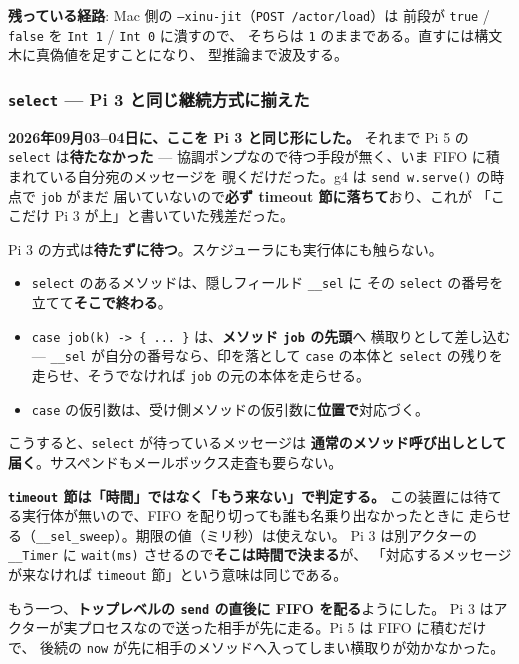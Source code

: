 \documentclass[11pt,a4paper]{ltjsarticle}
\begin{document}
\textbf{残っている経路}: Mac 側の \texttt{--xinu-jit}（\texttt{POST /actor/load}）は
前段が \texttt{true} / \texttt{false} を \texttt{Int 1} / \texttt{Int 0} に潰すので、
そちらは \texttt{1} のままである。直すには構文木に真偽値を足すことになり、
型推論まで波及する。

\subsubsection*{\texttt{select} --- Pi 3 と同じ継続方式に揃えた}
\label{sec:pi5-select}

\textbf{2026年09月03--04日に、ここを Pi 3 と同じ形にした。}
それまで Pi 5 の \texttt{select} は\textbf{待たなかった} ---
協調ポンプなので待つ手段が無く、いま FIFO に積まれている自分宛のメッセージを
覗くだけだった。g4 は \texttt{send w.serve()} の時点で \texttt{job} がまだ
届いていないので\textbf{必ず timeout 節に落ちて}おり、これが
「ここだけ Pi 3 が上」と書いていた残差だった。

Pi 3 の方式は\textbf{待たずに待つ}。スケジューラにも実行体にも触らない。

\begin{itemize}
\item \texttt{select} のあるメソッドは、隠しフィールド \texttt{\_\_sel} に
  その \texttt{select} の番号を立てて\textbf{そこで終わる}。
\item \texttt{case job(k) -> \{ ... \}} は、\textbf{メソッド \texttt{job} の先頭}へ
  横取りとして差し込む ---
  \texttt{\_\_sel} が自分の番号なら、印を落として \texttt{case} の本体と
  \texttt{select} の残りを走らせ、そうでなければ \texttt{job} の元の本体を走らせる。
\item \texttt{case} の仮引数は、受け側メソッドの仮引数に\textbf{位置で}対応づく。
\end{itemize}

こうすると、\texttt{select} が待っているメッセージは
\textbf{通常のメソッド呼び出しとして届く}。サスペンドもメールボックス走査も要らない。

\textbf{\texttt{timeout} 節は「時間」ではなく「もう来ない」で判定する。}
この装置には待てる実行体が無いので、FIFO を配り切っても誰も名乗り出なかったときに
走らせる（\texttt{\_\_sel\_sweep}）。期限の値（ミリ秒）は使えない。
Pi 3 は別アクターの \texttt{\_\_Timer} に \texttt{wait(ms)} させるので\textbf{そこは時間で決まる}が、
「対応するメッセージが来なければ \texttt{timeout} 節」という意味は同じである。

もう一つ、\textbf{トップレベルの \texttt{send} の直後に FIFO を配る}ようにした。
Pi 3 はアクターが実プロセスなので送った相手が先に走る。Pi 5 は FIFO に積むだけで、
後続の \texttt{now} が先に相手のメソッドへ入ってしまい横取りが効かなかった。
\end{document}
